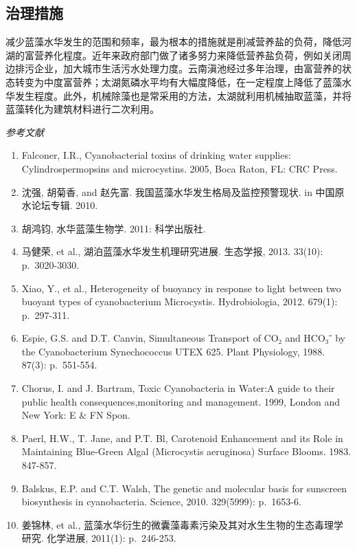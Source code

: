 \documentclass[
]{book}
\begin{document}
\hypertarget{ux6cbbux7406ux63aaux65bd}{%
\subsection{治理措施}\label{ux6cbbux7406ux63aaux65bd}}

减少蓝藻水华发生的范围和频率，最为根本的措施就是削减营养盐的负荷，降低河湖的富营养化程度。近年来政府部门做了诸多努力来降低营养盐负荷，例如关闭周边排污企业，加大城市生活污水处理力度。云南滇池经过多年治理，由富营养的状态转变为中度富营养；太湖氮磷水平均有大幅度降低，在一定程度上降低了蓝藻水华发生程度。此外，机械除藻也是常采用的方法，太湖就利用机械抽取蓝藻，并将蓝藻转化为建筑材料进行二次利用。

\emph{参考文献}

\begin{enumerate}
\def\labelenumi{\arabic{enumi}.}
\item
  Falconer, I.R., Cyanobacterial toxins of drinking water supplies: Cylindrospermopsins and microcystins. 2005, Boca Raton, FL: CRC Press.
\item
  沈强, 胡菊香, and 赵先富. 我国蓝藻水华发生格局及监控预警现状. in 中国原水论坛专辑. 2010.
\item
  胡鸿钧, 水华蓝藻生物学. 2011: 科学出版社.
\item
  马健荣, et al., 湖泊蓝藻水华发生机理研究进展. 生态学报, 2013. 33(10): p.~3020-3030.
\item
  Xiao, Y., et al., Heterogeneity of buoyancy in response to light between two buoyant types of cyanobacterium Microcystis. Hydrobiologia, 2012. 679(1): p.~297-311.
\item
  Espie, G.S. and D.T. Canvin, Simultaneous Transport of CO₂ and HCO₃⁻ by the Cyanobacterium Synechococcus UTEX 625. Plant Physiology, 1988. 87(3): p.~551-554.
\item
  Chorus, I. and J. Bartram, Toxic Cyanobacteria in Water:A guide to their public health consequences,monitoring and management. 1999, London and New York: E \& FN Spon.
\item
  Paerl, H.W., T. Jane, and P.T. Bl, Carotenoid Enhancement and its Role in Maintaining Blue-Green Algal (Microcystis aeruginosa) Surface Blooms. 1983. 847-857.
\item
  Balskus, E.P. and C.T. Walsh, The genetic and molecular basis for sunscreen biosynthesis in cyanobacteria. Science, 2010. 329(5999): p.~1653-6.
\item
  姜锦林, et al., 蓝藻水华衍生的微囊藻毒素污染及其对水生生物的生态毒理学研究. 化学进展, 2011(1): p.~246-253.

\end{enumerate}
\end{document}
